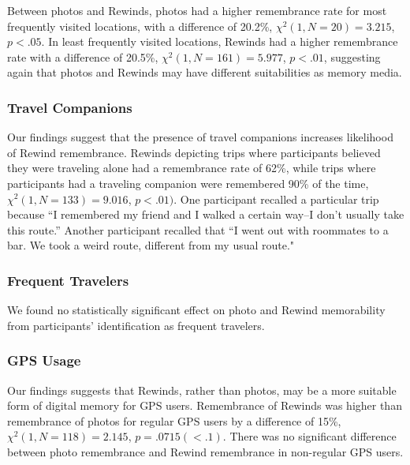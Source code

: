 \documentclass{sigchi}
\begin{document}
Between photos and Rewinds, photos had a higher remembrance rate for most frequently visited locations, with a difference of 20.2\%, $\chi^2(1, N=20) = 3.215$, $p < .05$. In least frequently visited locations, Rewinds had a higher remembrance rate with a difference of 20.5\%, $\chi^2(1, N=161) = 5.977$, $p < .01$, suggesting again that photos and Rewinds may have different suitabilities as memory media.

\subsubsection{Travel Companions}
Our findings suggest that the presence of travel companions increases likelihood of Rewind remembrance. Rewinds depicting trips where participants believed they were traveling alone had a remembrance rate of 62\%, while trips where participants had a traveling companion were remembered 90\% of the time, $\chi^2(1, N=133) = 9.016$, $p < .01)$. One participant recalled a particular trip because ``I remembered my friend and I walked a certain way--I don't usually take this route.'' Another participant recalled that ``I went out with roommates to a bar. We took a weird route, different from my usual route."

\subsubsection{Frequent Travelers}
We found no statistically significant effect on photo and Rewind memorability from participants' identification as frequent travelers.

\subsubsection{GPS Usage}
Our findings suggests that Rewinds, rather than photos, may be a more suitable form of digital memory for GPS users. Remembrance of Rewinds was higher than remembrance of photos for regular GPS users by a difference of 15\%, $\chi^2(1, N=118) = 2.145$, $p = .0715 (<.1)$. There was no significant difference between photo remembrance and Rewind remembrance in non-regular GPS users.
\end{document}
